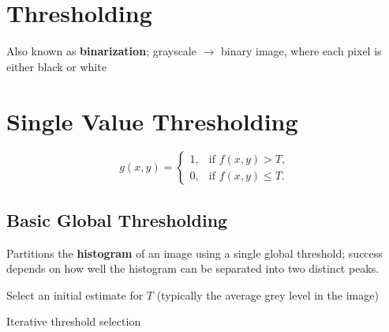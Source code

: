 \section*{Thresholding}

Also known as \textbf{binarization}; grayscale $\rightarrow$ binary
image, where each pixel is either black or white

\section*{Single Value Thresholding}

\begin{equation*}
  g(x,y) =
  \begin{cases}
    1, & \text{if } f(x,y) > T,\\
    0, & \text{if } f(x,y) \le T.
  \end{cases}
\end{equation*}

\subsection*{Basic Global Thresholding}

Partitions the \textbf{histogram} of an image using a single global
threshold; success depends on how well the histogram can be separated
into two distinct peaks.

\begin{algorithm}[ht]
  \SetAlgoLined
  \DontPrintSemicolon
  Select an initial estimate for $T$ (typically the average grey
  level in the image)\;
  \caption{Iterative threshold selection}
\end{algorithm}

